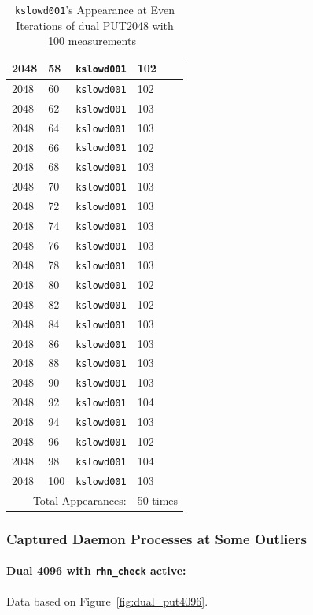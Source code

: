 \documentclass[10pt]{article}
\begin{document}
\begin{table}[htp!]
{\begin{tabular}{|l|l|l|l|}
2048 & 58 & {\tt kslowd001} & 102 \\ \hline
2048 & 60 & {\tt kslowd001} & 102 \\ \hline
2048 & 62 & {\tt kslowd001} & 103 \\ \hline
2048 & 64 & {\tt kslowd001} & 103 \\ \hline
2048 & 66 & {\tt kslowd001} & 102 \\ \hline
2048 & 68 & {\tt kslowd001} & 103 \\ \hline
2048 & 70 & {\tt kslowd001} & 103 \\ \hline
2048 & 72 & {\tt kslowd001} & 103 \\ \hline
2048 & 74 & {\tt kslowd001} & 103 \\ \hline
2048 & 76 & {\tt kslowd001} & 103 \\ \hline
2048 & 78 & {\tt kslowd001} & 103 \\ \hline
2048 & 80 & {\tt kslowd001} & 102 \\ \hline
2048 & 82 & {\tt kslowd001} & 102 \\ \hline
2048 & 84 & {\tt kslowd001} & 103 \\ \hline
2048 & 86 & {\tt kslowd001} & 103 \\ \hline
2048 & 88 & {\tt kslowd001} & 103 \\ \hline
2048 & 90 & {\tt kslowd001} & 103 \\ \hline
2048 & 92 & {\tt kslowd001} & 104 \\ \hline
2048 & 94 & {\tt kslowd001} & 103 \\ \hline
2048 & 96 & {\tt kslowd001} & 102 \\ \hline
2048 & 98 & {\tt kslowd001} & 104 \\ \hline
2048 & 100 & {\tt kslowd001} & 103 \\ \hline
\multicolumn{3}{|r|}{Total Appearances:} & 50 times\\ \hline
  \end{tabular}
  }
 \caption{{\tt kslowd001}'s Appearance at Even Iterations of dual PUT2048 with 100 measurements~\label{fig:rc_dual_put_2048_even1}}
\end{table}

\clearpage
\newpage

\subsubsection{Captured Daemon Processes at Some Outliers}

\paragraph{Dual 4096 with {\tt rhn\_check} active:} Data based on Figure~\ref{fig:dual_put4096}.
\end{document}
